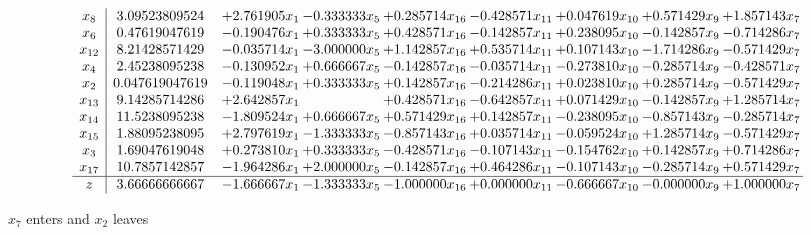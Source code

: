 \documentclass[10pt]{article}
\begin{document}
 \[\begin{array}{c| c c@{\hskip 2pt} c@{\hskip 2pt} c@{\hskip 2pt} c@{\hskip 2pt} c@{\hskip 2pt} c@{\hskip 2pt} c@{\hskip 2pt} }
 x_{8}   &  3.09523809524 & + 2.761905 x_{1} & -0.333333 x_{5} & + 0.285714 x_{16} & -0.428571 x_{11} & + 0.047619 x_{10} & + 0.571429 x_{9} & + 1.857143 x_{7}\\
 x_{6}   &  0.47619047619 & -0.190476 x_{1} & + 0.333333 x_{5} & + 0.428571 x_{16} & -0.142857 x_{11} & + 0.238095 x_{10} & -0.142857 x_{9} & -0.714286 x_{7}\\
 x_{12}   &  8.21428571429 & -0.035714 x_{1} & -3.000000 x_{5} & + 1.142857 x_{16} & + 0.535714 x_{11} & + 0.107143 x_{10} & -1.714286 x_{9} & -0.571429 x_{7}\\
 x_{4}   &  2.45238095238 & -0.130952 x_{1} & + 0.666667 x_{5} & -0.142857 x_{16} & -0.035714 x_{11} & -0.273810 x_{10} & -0.285714 x_{9} & -0.428571 x_{7}\\
 x_{2}   &  0.047619047619 & -0.119048 x_{1} & + 0.333333 x_{5} & + 0.142857 x_{16} & -0.214286 x_{11} & + 0.023810 x_{10} & + 0.285714 x_{9} & -0.571429 x_{7}\\
 x_{13}   &  9.14285714286 & + 2.642857 x_{1} &   & + 0.428571 x_{16} & -0.642857 x_{11} & + 0.071429 x_{10} & -0.142857 x_{9} & + 1.285714 x_{7}\\
 x_{14}   &  11.5238095238 & -1.809524 x_{1} & + 0.666667 x_{5} & + 0.571429 x_{16} & + 0.142857 x_{11} & -0.238095 x_{10} & -0.857143 x_{9} & -0.285714 x_{7}\\
 x_{15}   &  1.88095238095 & + 2.797619 x_{1} & -1.333333 x_{5} & -0.857143 x_{16} & + 0.035714 x_{11} & -0.059524 x_{10} & + 1.285714 x_{9} & -0.571429 x_{7}\\
 x_{3}   &  1.69047619048 & + 0.273810 x_{1} & + 0.333333 x_{5} & -0.428571 x_{16} & -0.107143 x_{11} & -0.154762 x_{10} & + 0.142857 x_{9} & + 0.714286 x_{7}\\
 x_{17}   &  10.7857142857 & -1.964286 x_{1} & + 2.000000 x_{5} & -0.142857 x_{16} & + 0.464286 x_{11} & -0.107143 x_{10} & -0.285714 x_{9} & + 0.571429 x_{7}\\
\hline
z    &  3.66666666667 & -1.666667 x_{1} & -1.333333 x_{5} & -1.000000 x_{16} & + 0.000000 x_{11} & -0.666667 x_{10} & -0.000000 x_{9} & + 1.000000 x_{7}\\
\end{array}\]


 $ x_{7} $ enters and $ x_{2} $ leaves 
\end{document}
